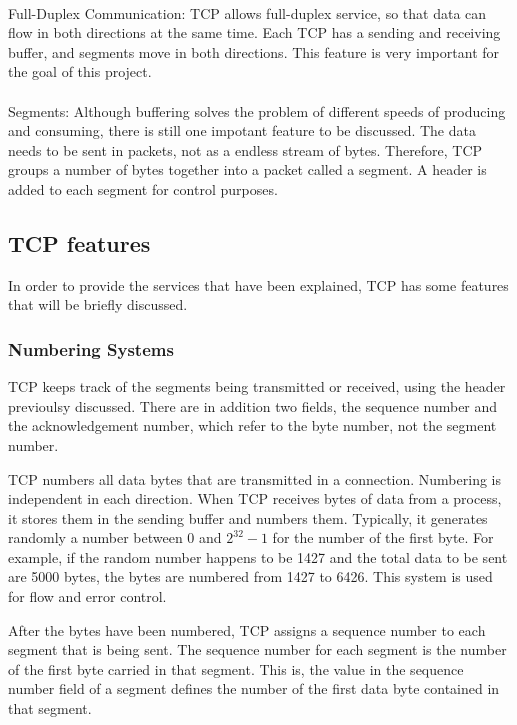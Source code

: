 \documentclass[12pt,a4paper]{report}
\begin{document}
\paragraph{}
Full-Duplex Communication: TCP allows full-duplex service, so that data can flow in both directions at the same time. Each TCP has a sending and receiving buffer, and segments move in both directions. This feature is very important for the goal of this project.

\paragraph{}
Segments: Although buffering solves the problem of different speeds of producing and consuming, there is still one impotant feature to be discussed. The data needs to be sent in packets, not as a endless stream of bytes. Therefore, TCP groups a number of bytes together into a packet called a segment. A header is added to each segment for control purposes. 

\subsection{TCP features}
In order to provide the services that have been explained, TCP has some features that will be briefly discussed.


\subsubsection{Numbering Systems}
TCP keeps track of the segments being transmitted or received, using the header previoulsy discussed. 
There are in addition two fields, the sequence number and the acknowledgement number, which refer to the byte number, not the segment number.

TCP numbers all data bytes that are transmitted in a connection. Numbering is independent in each direction. When TCP receives bytes of data from a process, it stores them in the sending buffer and numbers them. Typically, it generates randomly a number between 0 and $2^{32}-1$ for the number of the first byte. For example, if the random number happens to be 1427 and the total data to be sent are 5000 bytes, the bytes are numbered from 1427 to 6426. This system is used for flow and error control.

After the bytes have been numbered, TCP assigns a sequence number to each segment that is being sent. The sequence number for each segment is the number of the first byte carried in that segment. This is, the value in the sequence number field of a segment defines the number of the first data byte contained in that segment. 
\end{document}
